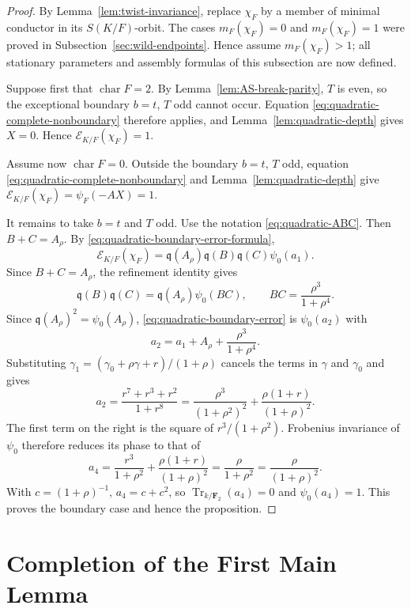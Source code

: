 \documentclass[11pt]{amsart}
\theoremstyle{definition}
\theoremstyle{remark}
\newcommand{\F}{\mathbf F}
\newcommand{\Tr}{\operatorname{Tr}}
\newcommand{\Err}{\mathcal E}
\begin{document}
\begin{proof}
By Lemma~\ref{lem:twist-invariance}, replace $\chi_F$ by a member of
minimal conductor in its $S(K/F)$-orbit.  The cases
$m_F(\chi_F)=0$ and $m_F(\chi_F)=1$ were proved in
Subsection~\ref{sec:wild-endpoints}.  Hence assume
$m_F(\chi_F)>1$; all stationary parameters and assembly formulas of
this subsection are now defined.

Suppose first that $\operatorname{char}F=2$.  By
Lemma~\ref{lem:AS-break-parity}, $T$ is even, so the exceptional boundary
$b=t$, $T$ odd cannot occur.  Equation
\eqref{eq:quadratic-complete-nonboundary} therefore applies, and
Lemma~\ref{lem:quadratic-depth} gives $X=0$.  Hence
$\Err_{K/F}(\chi_F)=1$.

Assume now $\operatorname{char}F=0$.  Outside the boundary $b=t$, $T$
odd, equation \eqref{eq:quadratic-complete-nonboundary} and
Lemma~\ref{lem:quadratic-depth} give
$\Err_{K/F}(\chi_F)=\psi_F(-AX)=1$.

It remains to take $b=t$ and $T$ odd.  Use the notation
\eqref{eq:quadratic-ABC}.  Then $B+C=A_\rho$.  By
\eqref{eq:quadratic-boundary-error-formula},
\begin{equation}\label{eq:quadratic-boundary-error}
 \Err_{K/F}(\chi_F)
 =\mathfrak q(A_\rho)\mathfrak q(B)
  \mathfrak q(C)\psi_0(a_1).
\end{equation}
Since $B+C=A_\rho$, the refinement identity gives
\[
 \mathfrak q(B)\mathfrak q(C)
 =\mathfrak q(A_\rho)\psi_0(BC),
 \qquad BC=\frac{\rho^3}{1+\rho^4}.
\]
Since $\mathfrak q(A_\rho)^2=\psi_0(A_\rho)$,
\eqref{eq:quadratic-boundary-error} is $\psi_0(a_2)$ with
\[
 a_2=a_1+A_\rho+\frac{\rho^3}{1+\rho^4}.
\]
Substituting
$\gamma_1=(\gamma_0+\rho\gamma+r)/(1+\rho)$ cancels the terms in
$\gamma$ and $\gamma_0$ and gives
\begin{equation}\label{eq:quadratic-a2}
 a_2=
 \frac{r^7+r^3+r^2}{1+r^8}
 =\frac{\rho^3}{(1+\rho^2)^2}
  +\frac{\rho(1+r)}{(1+\rho)^2}.
\end{equation}
The first term on the right is the square of
$r^3/(1+\rho^2)$.  Frobenius invariance of $\psi_0$ therefore reduces
its phase to that of
\[
 a_4=\frac{r^3}{1+\rho^2}
     +\frac{\rho(1+r)}{(1+\rho)^2}
     =\frac{\rho}{1+\rho^2}
     =\frac{\rho}{(1+\rho)^2}.
\]
With $c=(1+\rho)^{-1}$, $a_4=c+c^2$, so
$\Tr_{k/\F_2}(a_4)=0$ and $\psi_0(a_4)=1$.  This proves the boundary
case and hence the proposition.
\end{proof}


\section{Completion of the First Main Lemma}\label{sec:first-main-completion}
\end{document}
